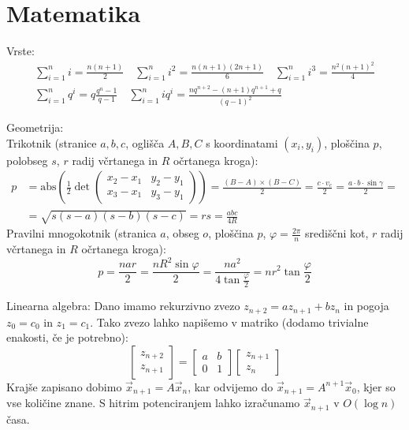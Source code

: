\documentclass[a4paper,oneside,12pt]{article}
\newenvironment{description*}%
{
\begin{description}
\setlength{\itemsep}{0pt}
\setlength{\parskip}{2pt}
}
{\end{description}}
\begin{document}
\section{Matematika}
\small
\begin{description*}
  \item[Vrste:] \vspace{-1ex}
    \begin{gather*}
      \sum_{i=1}^n i = \frac{n(n+1)}{2} \quad \sum_{i=1}^n i^2 = \frac{n(n+1)(2n+1)}{6} \quad
      \sum_{i=1}^n i^3 = \frac{n^2(n+1)^2}{4} \\
      \sum_{i=1}^n q^i = q \frac{q^n - 1}{q - 1} \quad \sum_{i=1}^n i q^i = \frac{n
        q^{n+2} - (n+1)q^{n+1} + q}{(q-1)^2}
    \end{gather*}
  \item[Geometrija:] \mbox{} \\
    Trikotnik (stranice $a, b, c$, oglišča $A, B, C$ s koordinatami $(x_i, y_i)$, ploščina $p$, polobseg $s$, $r$
    radij včrtanega in $R$ očrtanega kroga): \\
    \begin{align*}
    p &=
    \mathrm{abs}\left(\frac12 \det\left(
    \begin{matrix}
      x_2 - x_1 & y_2 - y_1 \\ x_3 - x_1 & y_3 - y_1
    \end{matrix}\right)\right) = \frac{(B-A)\times (B-C)}{2} = \frac{c \cdot v_c}{2} = \frac{a \cdot b \cdot
    \sin\gamma}{2} = \\
      &=\sqrt{s(s-a)(s-b)(s-c)} = rs = \frac{abc}{4R}
    \end{align*}
    Pravilni mnogokotnik (stranica $a$, obseg $o$, ploščina $p$, $\varphi = \frac{2\pi}{n}$
    središčni kot, $r$ radij včrtanega in $R$ očrtanega kroga): \\
    \[ p = \frac{nar}{2} = \frac{n R^2 \sin\varphi}{2} =
    \frac{na^2}{4\tan\frac{\varphi}{2}} = n r^2 \tan\frac{\varphi}{2} \]

  \item[Linearna algebra:]
    Dano imamo rekurzivno zvezo
    $z_{n+2} = a z_{n+1} + b z_n$ in pogoja $z_0 = c_0$ in $z_1 = c_1$.
    Tako zvezo lahko napišemo v matriko (dodamo trivialne enakosti, če je
    potrebno):
    \[
      \begin{bmatrix}
        z_{n+2} \\ z_{n+1}
      \end{bmatrix} =
      \begin{bmatrix}
        a & b \\ 0 & 1
      \end{bmatrix}
      \begin{bmatrix}
        z_{n+1} \\ z_{n}
    \end{bmatrix} \]
    Krajše zapisano dobimo $\vec{x}_{n+1} = A\vec{x}_n$, kar odvijemo do
    $\vec{x}_{n+1} = A^{n+1}\vec{x}_0$, kjer so vse količine znane. S hitrim
    potenciranjem lahko izračunamo $\vec{x}_{n+1}$ v $O(\log n)$ časa.


\end{description*}
\end{document}
